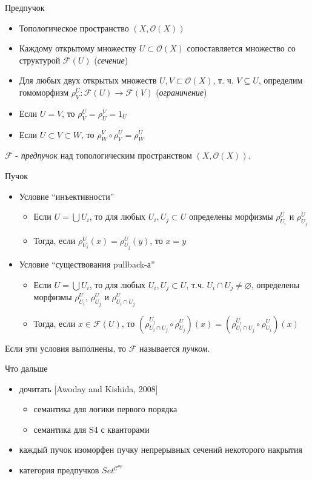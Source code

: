\documentclass{beamer}
\begin{document}
\begin{frame}{Предпучок}
\begin{itemize}
	\item Топологическое пространство $(X, \mathcal{O}(X))$
	\item Каждому открытому множеству $U \subset \mathcal{O}(X)$ сопоставляется множество со структурой $\mathcal{F}(U)$ (\textit{сечение})
	\item Для любых двух открытых множеств $U, V \subset \mathcal{O}(X)$, т. ч. $V \subseteq U$, определим гомоморфизм $\rho^U_V : \mathcal{F}(U) \to \mathcal{F}(V)$ (\textit{ограничение})
	\item Если $U = V$, то $\rho^U_V = \rho^V_U = 1_U$
	\item Если $U \subset V \subset W$, то $\rho^V_W \circ \rho^U_V = \rho^U_W$
\end{itemize}
\bigskip
$\mathcal{F}$ - \textit{предпучок} над топологическим пространством $(X, \mathcal{O}(X))$.
\end{frame}

\begin{frame}{Пучок}
\begin{itemize}
	\item Условие ``инъективности''
		\bigskip
		\begin{itemize}
			\item Если $U = \bigcup U_i$, то для любых $U_i, U_j \subset U$ определены морфизмы $\rho^U_{U_i}$ и $\rho^U_{U_j}$
			\medskip
			\item Тогда, если $\rho^U_{U_i}(x) = \rho^U_{U_j}(y)$, то $x = y$
		\end{itemize}
	\bigskip
	\item Условие ``существования pullback-а''
		\bigskip
		\begin{itemize}
			\item Если $U = \bigcup U_i$, то для любых $U_i, U_j \subset U$, т.ч. $U_i \cap U_j \neq \varnothing$, определены морфизмы $\rho^U_{U_i}$, $\rho^U_{U_j}$ и $\rho^U_{U_i \cap U_j}$
			\medskip
			\item Тогда, если $x \in \mathcal{F}(U)$, то $(\rho^{U_j}_{U_i \cap U_j} \circ \rho^U_{U_j})(x) = (\rho^{U_i}_{U_i \cap U_j} \circ \rho^U_{U_i})(x)$
		\end{itemize}
\end{itemize}
\bigskip
Если эти условия выполнены, то $\mathcal{F}$ называется \textit{пучком}.
\end{frame}

\begin{frame}{Что дальше}
\begin{itemize}
	\item дочитать [Awoday and Kishida, 2008]
		\begin{itemize}
			\item семантика для логики первого порядка
			\item семантика для S4 с кванторами
		\end{itemize}
	\item каждый пучок изоморфен пучку непрерывных сечений некоторого накрытия
	\item категория предпучков $Set^{\mathcal{C}^{op}}$
\end{itemize}
\end{frame}
\end{document}
